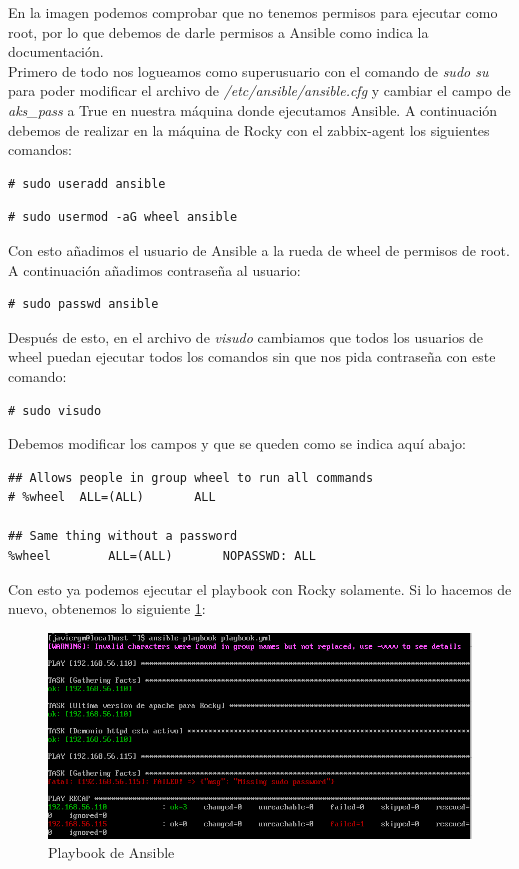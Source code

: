 En la imagen podemos comprobar que no tenemos permisos para ejecutar como root, por lo que debemos de darle permisos a Ansible como indica la documentación.\\

Primero de todo nos logueamos como superusuario con el comando de \textit{sudo su} para poder modificar el archivo de \textit{/etc/ansible/ansible.cfg} y cambiar el campo de \textit{aks\_pass} a True en nuestra máquina donde ejecutamos Ansible. A continuación debemos de realizar en la máquina de Rocky con el zabbix-agent los siguientes comandos:

\begin{lstlisting}
# sudo useradd ansible
\end{lstlisting}

\begin{lstlisting}
# sudo usermod -aG wheel ansible
\end{lstlisting}

Con esto añadimos el usuario de Ansible a la rueda de wheel de permisos de root. A continuación añadimos contraseña al usuario:

\begin{lstlisting}
# sudo passwd ansible
\end{lstlisting}

Después de esto, en el archivo de \textit{visudo} cambiamos que todos los usuarios de wheel puedan ejecutar todos los comandos sin que nos pida contraseña con este comando:

\begin{lstlisting}
# sudo visudo
\end{lstlisting}

Debemos modificar los campos y que se queden como se indica aquí abajo:

\begin{lstlisting}
## Allows people in group wheel to run all commands
# %wheel  ALL=(ALL)       ALL

## Same thing without a password
%wheel        ALL=(ALL)       NOPASSWD: ALL
\end{lstlisting}

Con esto ya podemos ejecutar el playbook  con Rocky solamente. Si lo hacemos de nuevo, obtenemos lo siguiente \ref{fig:ansible-playbook-wheel}:

\begin{figure}[H]
  \centering
  \includegraphics[scale=0.6]{Captura26}
  \caption{Playbook de Ansible}
  \label{fig:ansible-playbook-wheel}
\end{figure}

